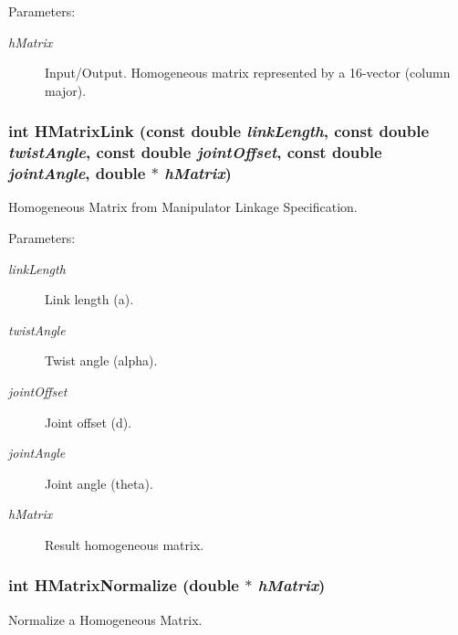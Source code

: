 \begin{Desc}
\item[Parameters:]
\begin{description}
\item[{\em hMatrix}]Input/Output. Homogeneous matrix represented by a 16-vector (column major). \end{description}
\end{Desc}
\hypertarget{group__homogeneous_g0c48c0e48e92cd283e7b110ac6a5704b}{
\subsubsection[HMatrixLink]{\setlength{\rightskip}{0pt plus 5cm}int HMatrixLink (const double {\em linkLength}, \/  const double {\em twistAngle}, \/  const double {\em jointOffset}, \/  const double {\em jointAngle}, \/  double $\ast$ {\em hMatrix})}}
\label{group__homogeneous_g0c48c0e48e92cd283e7b110ac6a5704b}


Homogeneous Matrix from Manipulator Linkage Specification. 

\begin{Desc}
\item[Parameters:]
\begin{description}
\item[{\em linkLength}]Link length (a). \item[{\em twistAngle}]Twist angle (alpha). \item[{\em jointOffset}]Joint offset (d). \item[{\em jointAngle}]Joint angle (theta). \item[{\em hMatrix}]Result homogeneous matrix. \end{description}
\end{Desc}
\hypertarget{group__homogeneous_gfc783d7c3cacff9513b7e461b243ee07}{
\subsubsection[HMatrixNormalize]{\setlength{\rightskip}{0pt plus 5cm}int HMatrixNormalize (double $\ast$ {\em hMatrix})}}
\label{group__homogeneous_gfc783d7c3cacff9513b7e461b243ee07}


Normalize a Homogeneous Matrix. 

